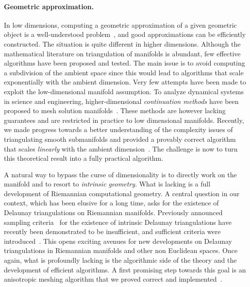 \paragraph{Geometric approximation.}
In low dimensions, computing a geometric approximation of a given geometric
object is a well-understood problem~\cite{geometrica-ecg-book,dey-csr-2007}, and good approximations can be
efficiently constructed.
The situation is quite different in higher dimensions.  Although the
mathematical literature on triangulation of manifolds is abundant, few
effective algorithms have been proposed and tested.  The main issue is
to avoid computing a subdivision of the ambient space since this would lead to algorithms that scale exponentially with the ambient dimension. Very few attempts have been made to exploit the  low-dimensional manifold assumption.
To analyze {dynamical systems} in science and engineering, higher-dimensional {\em continuation methods} have been proposed to mesh solution manifolds~\cite{mh-mpc-2002}. These methods are however lacking guarantees and are restricted in practice to low dimensional manifolds. 
Recently, we made progress towards a better understanding of the complexity issues of triangulating smooth submanifolds and provided a provably correct algorithm that scales {\em linearly} with the ambient dimension~\cite{boissonnat2010meshing}. 
The challenge is now to turn this theoretical result into a fully practical algorithm.

A natural way to bypass the curse of dimensionality is to directly
work on the manifold and to resort to {\em intrinsic geometry}. What
is lacking is a full development of Riemannian computational
geometry. A central question in our context, which has been elusive
for a long time, asks for the existence of Delaunay triangulations on
Riemannian manifolds. Previously announced sampling
criteria~\cite{leibon2000} for the existence of intrinsic Delaunay
triangulations have recently been demonstrated to be insufficient, and
sufficient criteria were introduced~\cite{boissonnat2012stab}. This opens exciting avenues for new developments on Delaunay triangulations in Riemannian manifolds and other non Euclidean spaces. Once again, what is profoundly lacking is the algorithmic side of the theory and the development of efficient algorithms.  A first promising step towards this goal is an anisotropic meshing algorithm that we proved correct and implemented~\cite{bwy-luam-08}.


